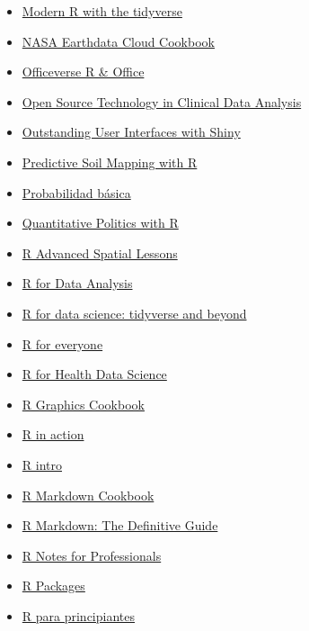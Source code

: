 \documentclass[
]{article}
\begin{document}
\begin{itemize}
\item
  \href{https://b-rodrigues.github.io/modern_R/}{Modern R with the
  tidyverse}
\item
  \href{https://nasa-openscapes.github.io/earthdata-cloud-cookbook/}{NASA
  Earthdata Cloud Cookbook}
\item
  \href{https://ardata-fr.github.io/officeverse/index.html}{Officeverse
  R \& Office}
\item
  \href{https://phuse-org.github.io/OSTCDA/}{Open Source Technology in
  Clinical Data Analysis}
\item
  \href{https://unleash-shiny.rinterface.com/}{Outstanding User
  Interfaces with Shiny}
\item
  \href{https://soilmapper.org/}{Predictive Soil Mapping with R}
\item
  \href{https://www.uv.es/ayala/docencia/probabilidad/prob.pdf}{Probabilidad
  básica}
\item
  \href{http://qpolr.com/}{Quantitative Politics with R}
\item
  \href{https://bbest.github.io/R-adv-spatial-lessons/}{R Advanced
  Spatial Lessons}
\item
  \href{https://trevorfrench.github.io/R-for-Data-Analysis/}{R for Data
  Analysis}
\item
  \href{https://bookdown.org/Maxine/r4ds/}{R for data science: tidyverse
  and beyond}
\item
  \href{https://www.jaredlander.com/r-for-everyone/}{R for everyone}
\item
  \href{https://argoshare.is.ed.ac.uk/healthyr_book/}{R for Health Data
  Science}
\item
  \href{https://r-graphics.org/index.html}{R Graphics Cookbook}
\item
  \href{https://www.manning.com/books/r-in-action-second-edition}{R in
  action}
\item
  \href{https://cran.r-project.org/doc/manuals/R-intro.pdf}{R intro}
\item
  \href{https://bookdown.org/yihui/rmarkdown-cookbook/}{R Markdown
  Cookbook}
\item
  \href{https://bookdown.org/yihui/rmarkdown/}{R Markdown: The
  Definitive Guide}
\item
  \href{https://books.goalkicker.com/RBook/}{R Notes for Professionals}
\item
  \href{https://r-pkgs.org/}{R Packages}
\item
  \href{https://cran.r-project.org/doc/contrib/rdebuts_es.pdf}{R para
  principiantes}

\end{itemize}
\end{document}
